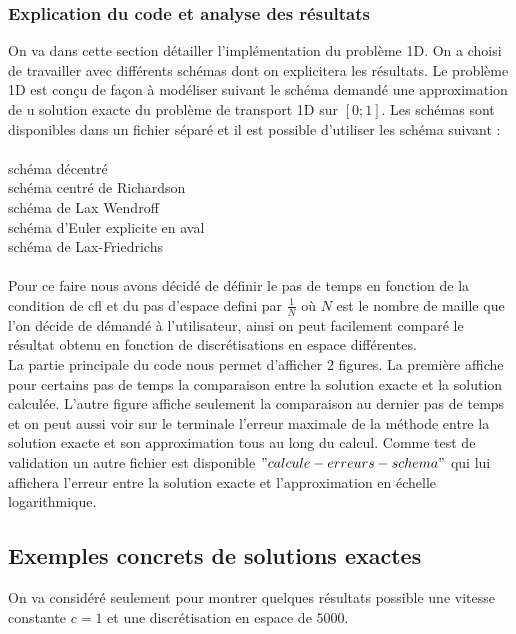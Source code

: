 \documentclass[12pt]{article}
\begin{document}
\subsubsection{Explication du code et analyse des résultats}
On va dans cette section détailler l'implémentation du problème 1D.
On a choisi de travailler  avec différents schémas dont on explicitera les résultats.
Le problème 1D est conçu de façon à modéliser suivant le schéma demandé une approximation de u solution exacte du problème de transport 1D sur $[0;1]$.
Les schémas sont disponibles dans un fichier séparé et il est possible d'utiliser les schéma suivant :
\\
\\schéma décentré
\\schéma centré de Richardson
\\schéma de Lax Wendroff
\\schéma d'Euler explicite en aval
\\schéma de Lax-Friedrichs
\\
\\Pour ce faire nous avons décidé de définir le pas de temps en fonction de la condition de cfl et du pas d'espace defini par $\frac{1}{N}$ où $N$ est le nombre de maille que l'on décide de démandé à l'utilisateur, ainsi on peut facilement comparé le résultat obtenu en fonction de discrétisations en espace différentes.
\\La partie principale du code nous permet d'afficher $2$ figures. La première affiche pour certains pas de temps la comparaison entre la solution exacte et la solution calculée. L'autre figure affiche seulement la comparaison au dernier pas de temps et on peut aussi voir sur le terminale l'erreur maximale de la méthode entre la solution exacte et son approximation tous au long du calcul. Comme test de validation un autre fichier est disponible $"calcule-erreurs -schema"$ qui lui affichera l'erreur entre la solution exacte et l'approximation en échelle logarithmique.
\subsection{Exemples concrets de solutions exactes}
On va considéré seulement pour montrer quelques résultats possible une vitesse constante $c=1$ et une discrétisation en espace de $5000$.
\end{document}

